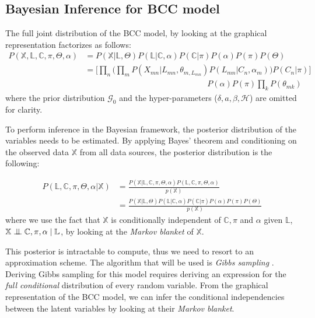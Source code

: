 \subsection{Bayesian Inference for BCC model}\label{integr-bayes-inference-subsect}
The full joint distribution of the BCC model, by looking at the graphical representation factorizes as follows:
\begin{equation}%
  \begin{aligned}
	P(\mathbb{X}, \mathbb{L}, \mathbb{C}, \pi , \Theta , \alpha) & = P(\mathbb{X}|\mathbb{L},\Theta) P(\mathbb{L}|\mathbb{C},\alpha) P(\mathbb{C}|\pi) P(\alpha) P(\pi) P(\Theta) \\
	  & = \bigg[\prod_{n}\bigg(\prod_{m} P(X_{mn}|L_{mn},\theta_{m,L_{mn}}) P(L_{mn}|C_{n},\alpha_{m})\bigg) P(C_{n}|\pi)\bigg] \\
	  & \quad \quad \quad \quad \quad \quad \quad \quad \quad \quad \quad \quad \quad \quad \quad P(\alpha) P(\pi) \prod_{k} P(\theta_{mk})
  \end{aligned}
\end{equation}
where the prior distribution $\mathcal{G}_{0}$ and the hyper-parameters ($\delta, \mathit{a}, \beta, \mathcal{H}$) are omitted for clarity.

To perform inference in the Bayesian framework, the posterior distribution of the variables needs to be estimated. By applying Bayes' theorem and conditioning on the observed data $\mathbb{X}$ from all data sources, the posterior distribution is the following:

\begin{equation}%
	\begin{aligned}
	P(\mathbb{L},\mathbb{C},\pi,\Theta,\alpha | \mathbb{X}) & = \frac{P(\mathbb{X}|\mathbb{L},\mathbb{C},\pi,\Theta,\alpha) P(\mathbb{L},\mathbb{C},\pi,\Theta,\alpha)}{p(\mathbb{X})} \\
	& = \frac{P(\mathbb{X}|\mathbb{L},\Theta) P(\mathbb{L}|\mathbb{C},\alpha) P(\mathbb{C}|\pi) P(\alpha) P(\pi) P(\Theta)}{p(\mathbb{X})}
	\end{aligned}
\end{equation}
where we use the fact that $\mathbb{X}$ is conditionally independent of $\mathbb{C}, \pi$ and $\alpha$ given $\mathbb{L}$, \ie $\mathbb{X} \bigCI \mathbb{C}, \pi, \alpha \mid \mathbb{L}$, by looking at the \emph{Markov blanket} of $\mathbb{X}$. 

This posterior is intractable to compute, thus we need to resort to an approximation scheme. The algorithm that will be used is \emph{Gibbs sampling} \citep{Geman1984}. Deriving Gibbs sampling for this model requires deriving an expression for the \emph{full conditional} distribution of every random variable. From the graphical representation of the BCC model, we can infer the conditional independencies between the latent variables by looking at their \emph{Markov blanket}. 

